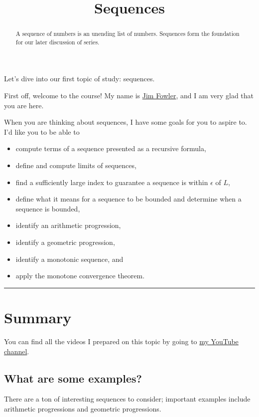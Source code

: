 \documentclass{ximera}
\title{Sequences}
\begin{document}
\begin{abstract}
  A sequence of numbers is an unending list of numbers.  Sequences form the foundation for our later discussion of series.
\end{abstract}

\maketitle

Let's dive into our first topic of study: sequences.

First off, welcome to the course!  My name is \href{http://kisonecat.com/}{Jim Fowler}, and I am very glad that you are here.

When you are thinking about sequences, I have some goals for you to aspire to.  I'd like you to be able to
\begin{itemize}
\item compute terms of a sequence presented as a recursive formula,
\item define and compute limits of sequences,
\item find a sufficiently large index to guarantee a sequence is within \(\epsilon\) of \(L\),
\item define what it means for a sequence to be bounded and determine when a sequence is bounded,
\item identify an arithmetic progression,
\item identify a geometric progression,
\item identify a monotonic sequence, and
\item apply the monotone convergence theorem.
\end{itemize}

\hrule

\section{Summary}

You can find all the videos I prepared on this topic by going to \href{https://www.youtube.com/playlist?list=PLjOkVtsM_edJgB9yG6fRb5VXsoSxQN0L5}{my YouTube channel}.

\subsection{What are some examples?}

There are a ton of interesting sequences to consider; important examples include arithmetic progressions and geometric progressions.
\end{document}
